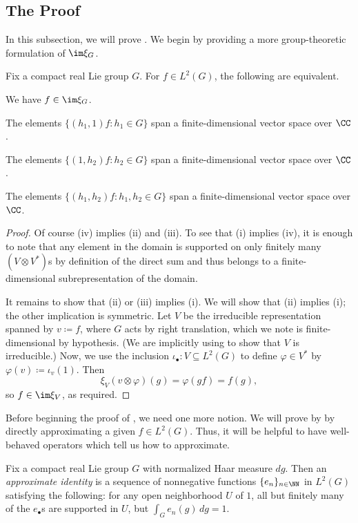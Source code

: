 \documentclass[notes.tex]{subfiles}
\begin{document}
\subsection{The Proof}
In this subsection, we will prove . We begin by providing a more group-theoretic formulation of $\im\xi_G$.
\begin{lemma} \label{lem:better-im-xi}
	Fix a compact real Lie group $G$. For $f\in L^2(G)$, the following are equivalent.
	\begin{listroman}
		\item We have $f\in\im\xi_G$.
		\item The elements $\{(h_1,1)f:h_1\in G\}$ span a finite-dimensional vector space over $\CC$.
		\item The elements $\{(1,h_2)f:h_2\in G\}$ span a finite-dimensional vector space over $\CC$.
		\item The elements $\{(h_1,h_2)f:h_1,h_2\in G\}$ span a finite-dimensional vector space over $\CC$.
	\end{listroman}
\end{lemma}
\begin{proof}
	Of course (iv) implies (ii) and (iii). To see that (i) implies (iv), it is enough to note that any element in the domain is supported on only finitely many $(V\otimes V^*)$s by definition of the direct sum and thus belongs to a finite-dimensional subrepresentation of the domain.

	It remains to show that (ii) or (iii) implies (i). We will show that (ii) implies (i); the other implication is symmetric. Let $V$ be the irreducible representation spanned by $v\coloneqq f$, where $G$ acts by right translation, which we note is finite-dimensional by hypothesis. (We are implicitly using  to show that $V$ is irreducible.) Now, we use the inclusion $\iota_\bullet\colon V\subseteq L^2(G)$ to define $\varphi\in V^*$ by $\varphi(v)\coloneqq\iota_v(1)$. Then
	\[\xi_V(v\otimes\varphi)(g)=\varphi(gf)=f(g),\]
	so $f\in\im\xi_V$, as required.
\end{proof}
Before beginning the proof of , we need one more notion. We will prove by  by directly approximating a given $f\in L^2(G)$. Thus, it will be helpful to have well-behaved operators which tell us how to approximate.
\begin{definition}
	Fix a compact real Lie group $G$ with normalized Haar measure $dg$. Then an \textit{approximate identity} is a sequence of nonnegative functions $\{e_n\}_{n\in\NN}$ in $L^2(G)$ satisfying the following: for any open neighborhood $U$ of $1$, all but finitely many of the $e_\bullet$s are supported in $U$, but $\int_Ge_n(g)\,dg=1$.
\end{definition}
\end{document}
